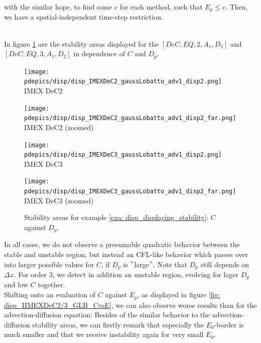 with the similar hope, to find some $c$ for each method, such that $E_p\le c$. Then, we have a spatial-independent time-step restriction.\\
\begin{example}\label{exa: disp_displaying_stability}\mbox{}\\
	In figure \ref{fig: disp_IIMEXDeC2/3_GLB_CvsD} are the stability areas displayed for the $[DeC, EQ,2,A_1, D_2]$ and \\$[DeC, EQ,3,A_1, D_2]$ in dependence of $C$ and $D_p$.
	\begin{figure}[!h]
		\centering
		\begin{minipage}[t]{0.24\textwidth}
			\centering
			\texttt{[image: pdepics/disp/disp\_IMEXDeC2\_gaussLobatto\_adv1\_disp2.png]}
			IMEX DeC2
		\end{minipage} 
		\begin{minipage}[t]{0.24\textwidth}
			\centering
			\texttt{[image: pdepics/disp/disp\_IMEXDeC2\_gaussLobatto\_adv1\_disp2\_far.png]}
			IMEX DeC2 (zoomed)
		\end{minipage}
		\begin{minipage}[t]{0.24\textwidth}
			\centering
			\texttt{[image: pdepics/disp/disp\_IMEXDeC3\_gaussLobatto\_adv1\_disp2.png]}
			IMEX DeC3
		\end{minipage}
		\begin{minipage}[t]{0.24\textwidth}
			\centering
			\texttt{[image: pdepics/disp/disp\_IMEXDeC3\_gaussLobatto\_adv1\_disp2\_far.png]}
			IMEX DeC3 (zoomed)
		\end{minipage}
		\caption{Stability areas for example \ref{exa: disp_displaying_stability}: $C$ against $D_p$.}
		\label{fig: disp_IIMEXDeC2/3_GLB_CvsD}
	\end{figure}
	In all cases, we do not observe a presumable quadratic behavior between the stable and unstable region, but instead an CFL-like behavior which passes over into larger possible values for $C$, if $D_p$ is $"$large$"$. Note that $D_p$ still depends on $\Delta x$. For order 3, we detect in addition an unstable region, evolving for lager $D_p$ and low $C$ together.\\
	Shifting onto an evaluation of $C$ against $E_p$, as displayed in figure \ref{fig: disp_IIMEXDeC2/3_GLB_CvsE}, we can also observe worse results than for the advection-diffusion equation: Besides of the similar behavior to the advection-diffusion stability areas, we can firstly remark that especially the $E_0$-border is much smaller and that we receive instability again for very small $E_0$.\\

\end{example}
